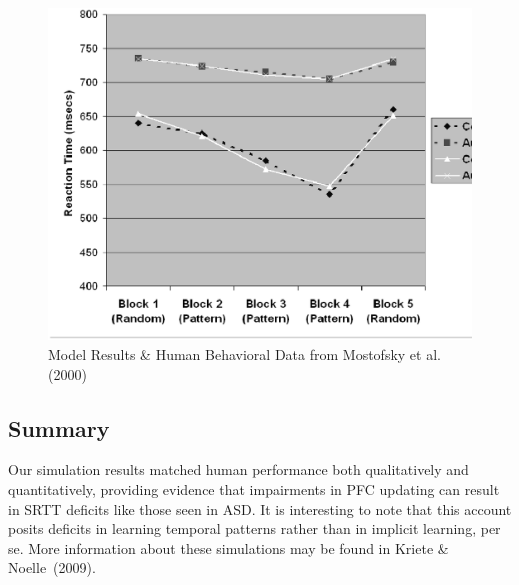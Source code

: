 \begin{figure}[t]
\begin{center}
	\includegraphics[width=115mm]{graphs/srtt_chart.ps}
\end{center}
\caption{Model Results \& Human Behavioral Data from Mostofsky
         et al. (2000)} 
\label{Model-Results}
\end{figure} 

\subsection{Summary}

Our simulation results matched human performance both qualitatively and quantitatively, providing evidence that impairments in PFC updating can result in SRTT deficits like those seen in ASD. It is interesting to note that this account posits deficits in learning temporal patterns rather than in implicit learning, per se. More information about these simulations may be found in Kriete \& Noelle~(2009).\nocite{KrieteT:2009:SRTT}

